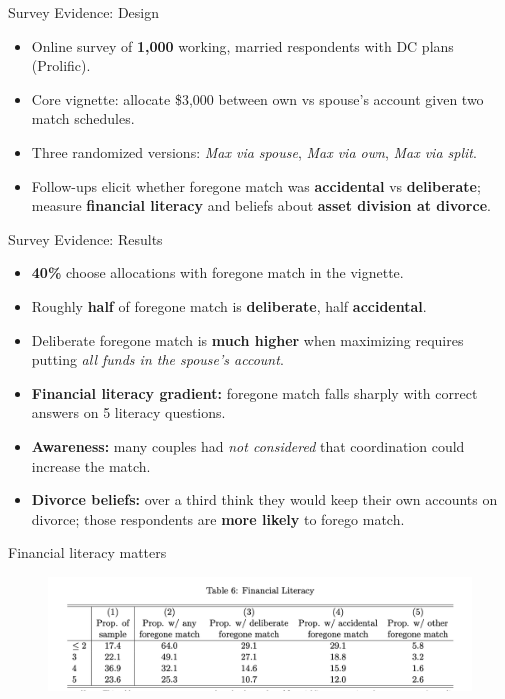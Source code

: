 \documentclass[11pt,notes=hide,aspectratio=169,mathserif]{beamer}
\begin{document}
\begin{frame}{Survey Evidence: Design}
\small
\begin{itemize}
  \item Online survey of \textbf{1{,}000} working, married respondents with DC plans (Prolific).
  \item Core vignette: allocate \$3{,}000 between own vs spouse's account given two match schedules.
  \item Three randomized versions: \textit{Max via spouse}, \textit{Max via own}, \textit{Max via split}.
  \item Follow-ups elicit whether foregone match was \textbf{accidental} vs \textbf{deliberate}; measure \textbf{financial literacy} and beliefs about \textbf{asset division at divorce}.
\end{itemize}
\end{frame}

\begin{frame}{Survey Evidence: Results}
\small
\begin{itemize}
  \item \textbf{40\%} choose allocations with foregone match in the vignette.
  \item Roughly \textbf{half} of foregone match is \textbf{deliberate}, half \textbf{accidental}.
  \item Deliberate foregone match is \textbf{much higher} when maximizing requires putting \emph{all funds in the spouse's account}.
  \item \textbf{Financial literacy gradient:} foregone match falls sharply with correct answers on 5 literacy questions.
  \item \textbf{Awareness:} many couples had \emph{not considered} that coordination could increase the match.
  \item \textbf{Divorce beliefs:} over a third think they would keep their own accounts on divorce; those respondents are \textbf{more likely} to forego match.
\end{itemize}
\end{frame}

\begin{frame}{Financial literacy matters}
\small
\begin{figure}
\centering
\includegraphics[width=0.9\linewidth]{inputs/table6.png}
\end{figure}
\end{frame}
\end{document}
